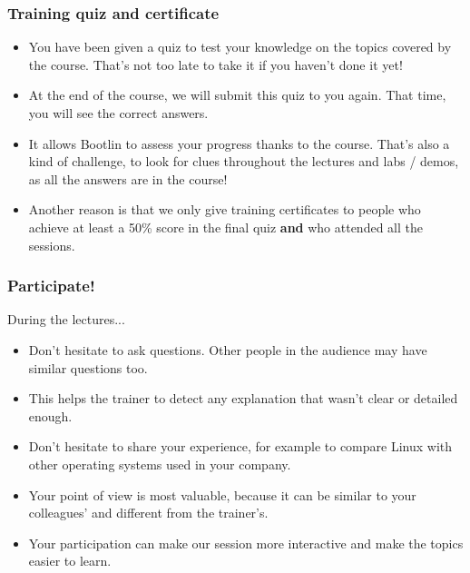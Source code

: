 \begin{frame}
\frametitle{Training quiz and certificate}
\begin{itemize}
\item You have been given a quiz to test your knowledge
      on the topics covered by the course.
      That's not too late to take it if you haven't done it yet!
\item At the end of the course, we will submit this quiz
      to you again. That time, you will see the correct answers.
\item It allows Bootlin to assess your progress thanks to the course.
      That's also a kind of challenge, to look for clues throughout
      the lectures and labs / demos, as all the answers are in the course!
\item Another reason is that we only give training certificates
      to people who achieve at least a 50\% score in the final quiz
      {\bf and} who attended all the sessions.
\end{itemize}
\end{frame}

\begin{frame}

\frametitle{Participate!}
During the lectures...
\begin{itemize}
\item Don't hesitate to ask questions. Other people in the audience may have
similar questions too.
\item This helps the trainer to detect any explanation that wasn't clear or
detailed enough.
\item Don't hesitate to share your experience, for example to compare Linux
with other operating systems used in your company.
\item Your point of view is most valuable, because it can be similar to your
colleagues' and different from the trainer's.
\item Your participation can make our session more interactive and make the
topics easier to learn.
\end{itemize}
\end{frame}

